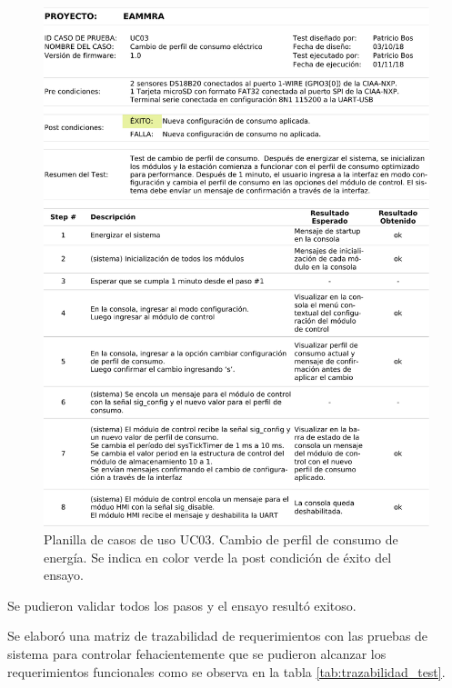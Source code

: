 \vspace{10px}

\begin{figure}[!htb]
	\centering
	\includegraphics[width=1\textwidth]{./Figures/UseCase3.pdf}
	\caption{Planilla de casos de uso UC03.  Cambio de perfil de consumo de energía. Se indica en color verde la post condición de éxito del ensayo.}
	\label{fig:useCase3}
\end{figure}

Se pudieron validar todos los pasos y el ensayo resultó exitoso.

Se elaboró una matriz de trazabilidad de requerimientos con las pruebas de sistema para controlar fehacientemente que se pudieron alcanzar los requerimientos funcionales como se observa en la tabla \ref{tab:trazabilidad_test}. 

